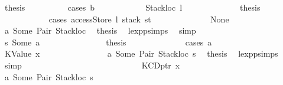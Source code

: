 \begin{isabellebody}
\ {\isacharquery}{\kern0pt}thesis\isanewline
\ \ \ \ \ \ \ \ \isamarkupfalse%
\ {\isacharparenleft}{\kern0pt}cases\ b{\isacharparenright}{\kern0pt}\isanewline
\ \ \ \ \ \ \ \ \ \ \isamarkupfalse%
\ {\isacharparenleft}{\kern0pt}Stackloc\ l{\isacharparenright}{\kern0pt}\isanewline
\ \ \ \ \ \ \ \ \ \ \isamarkupfalse%
\ \isamarkupfalse%
\ {\isacharquery}{\kern0pt}thesis\isanewline
\ \ \ \ \ \ \ \ \ \ \isamarkupfalse%
\ {\isacharparenleft}{\kern0pt}cases\ {\isachardoublequoteopen}accessStore\ l\ {\isacharparenleft}{\kern0pt}stack\ st{\isacharparenright}{\kern0pt}{\isachardoublequoteclose}{\isacharparenright}{\kern0pt}\isanewline
\ \ \ \ \ \ \ \ \ \ \ \ \isamarkupfalse%
\ None\isanewline
\ \ \ \ \ \ \ \ \ \ \ \ \isamarkupfalse%
\ a{}\ Some\ Pair\ Stackloc\ \isamarkupfalse%
\ {\isacharquery}{\kern0pt}thesis\ \isamarkupfalse%
\ lexp{\isachardot}{\kern0pt}psimps{\isacharparenleft}{\kern0pt}{}{\isacharparenright}{\kern0pt}\ \isamarkupfalse%
\ simp\isanewline
\ \ \ \ \ \ \ \ \ \ \isamarkupfalse%
\isanewline
\ \ \ \ \ \ \ \ \ \ \ \ \isamarkupfalse%
\ s{}{\isacharcolon}{\kern0pt}\ {\isacharparenleft}{\kern0pt}Some\ a{\isacharparenright}{\kern0pt}\isanewline
\ \ \ \ \ \ \ \ \ \ \ \ \isamarkupfalse%
\ \isamarkupfalse%
\ {\isacharquery}{\kern0pt}thesis\isanewline
\ \ \ \ \ \ \ \ \ \ \ \ \isamarkupfalse%
\ {\isacharparenleft}{\kern0pt}cases\ a{\isacharparenright}{\kern0pt}\isanewline
\ \ \ \ \ \ \ \ \ \ \ \ \ \ \isamarkupfalse%
\ {\isacharparenleft}{\kern0pt}KValue\ x{}{\isacharparenright}{\kern0pt}\isanewline
\ \ \ \ \ \ \ \ \ \ \ \ \ \ \isamarkupfalse%
\ a{}\ Some\ Pair\ Stackloc\ s{}\ \isamarkupfalse%
\ {\isacharquery}{\kern0pt}thesis\ \isamarkupfalse%
\ lexp{\isachardot}{\kern0pt}psimps{\isacharparenleft}{\kern0pt}{}{\isacharparenright}{\kern0pt}\ \isamarkupfalse%
\ simp\isanewline
\ \ \ \ \ \ \ \ \ \ \ \ \isamarkupfalse%
\isanewline
\ \ \ \ \ \ \ \ \ \ \ \ \ \ \isamarkupfalse%
\ {\isacharparenleft}{\kern0pt}KCDptr\ x{}{\isacharparenright}{\kern0pt}\isanewline
\ \ \ \ \ \ \ \ \ \ \ \ \ \ \isamarkupfalse%
\ a{}\ Some\ Pair\ Stackloc\ s{}\ \isamarkupfalse%

\end{isabellebody}
